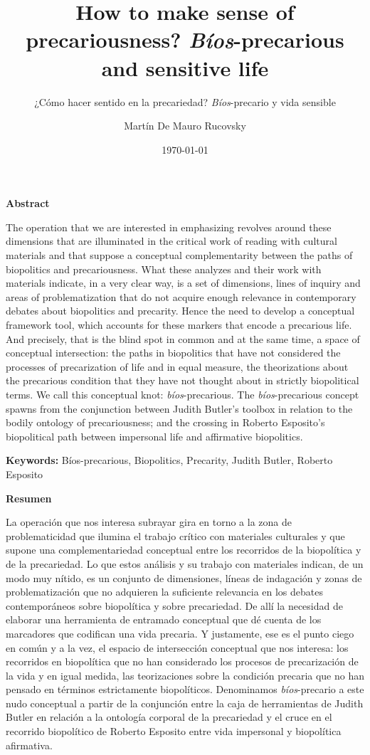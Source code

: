 \documentclass[a4paper,]{scrartcl}
\title{How to make sense of precariousness? \emph{Bíos}-precarious and
sensitive life}
\subtitle{¿Cómo hacer sentido en la precariedad? \emph{Bíos}-precario y vida
sensible}
\author{Martín De Mauro Rucovsky}
\date{\today}
\begin{document}
\maketitle

\textbf{Abstract}

The operation that we are interested in emphasizing revolves around
these dimensions that are illuminated in the critical work of reading
with cultural materials and that suppose a conceptual complementarity
between the paths of biopolitics and precariousness. What these analyzes
and their work with materials indicate, in a very clear way, is a set of
dimensions, lines of inquiry and areas of problematization that do not
acquire enough relevance in contemporary debates about biopolitics and
precarity. Hence the need to develop a conceptual framework tool, which
accounts for these markers that encode a precarious life. And precisely,
that is the blind spot in common and at the same time, a space of
conceptual intersection: the paths in biopolitics that have not
considered the processes of precarization of life and in equal measure,
the theorizations about the precarious condition that they have not
thought about in strictly biopolitical terms. We call this conceptual
knot: \emph{bíos}-precarious. The \emph{bíos}-precarious concept spawns
from the conjunction between Judith Butler's toolbox in relation to the
bodily ontology of precariousness; and the crossing in Roberto
Esposito's biopolitical path between impersonal life and affirmative
biopolitics.

\textbf{Keywords:} Bíos-precarious, Biopolitics, Precarity, Judith
Butler, Roberto Esposito

\textbf{Resumen}

La operación que nos interesa subrayar gira en torno a la zona de
problematicidad que ilumina el trabajo crítico con materiales culturales
y que supone una complementariedad conceptual entre los recorridos de la
biopolítica y de la precariedad. Lo que estos análisis y su trabajo con
materiales indican, de un modo muy nítido, es un conjunto de
dimensiones, líneas de indagación y zonas de problematización que no
adquieren la suficiente relevancia en los debates contemporáneos sobre
biopolítica y sobre precariedad. De allí la necesidad de elaborar una
herramienta de entramado conceptual que dé cuenta de los marcadores que
codifican una vida precaria. Y justamente, ese es el punto ciego en
común y a la vez, el espacio de intersección conceptual que nos
interesa: los recorridos en biopolítica que no han considerado los
procesos de precarización de la vida y en igual medida, las
teorizaciones sobre la condición precaria que no han pensado en términos
estrictamente biopolíticos. Denominamos \emph{bíos}-precario a este nudo
conceptual a partir de la conjunción entre la caja de herramientas de
Judith Butler en relación a la ontología corporal de la precariedad y el
cruce en el recorrido biopolítico de Roberto Esposito entre vida
impersonal y biopolítica afirmativa.
\end{document}
